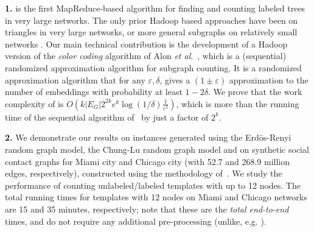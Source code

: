 
\smallskip
\textbf{1.} \sahad{} is the first MapReduce-based algorithm for finding and
counting labeled trees in very large networks.
The only prior Hadoop based approaches have been on triangles
\cite{tsourakakis2009doulion, pagh2011colorful, suri2011counting} in very large
networks, or more general subgraphs on relatively small networks
\cite{liu2009mapreduce}. Our main technical contribution is the development of a
Hadoop version of the \emph{color coding}
algorithm of Alon \emph{et al}.~\cite{alon2008biomolecular, alon1995color}, which
is a (sequential) randomized approximation algorithm for subgraph counting.
It is a randomized approximation algorithm that for any $\varepsilon, \delta$,
gives a $(1\pm\varepsilon)$ approximation to the number of embeddings with
probability at least $1-2\delta$.
We prove that the work complexity of \sahad{} is
$O(k|E_G|2^{2k}e^k\log{(1/\delta)}\frac{1}{\varepsilon^2})$, which is more than
the running time of the sequential algorithm of~\cite{alon2008biomolecular}
by just a factor of $2^k$.

\iffalse
One of the main challenges for parallel algorithms is that only a part of the
graph can be stored in memory if it is very large. Most real networks are characterized
by small diameter and high expansion, so that even storing the $d$-neighborhood
of a node  $v$ (consisting of nodes within distance $d$ of $v$) is infeasible.
This makes searching for subgraphs with diameter more than $d$ very challenging,
since an embedding might be split across partitions. Our approach based on
color-coding solves this ingeniously by considering ``colorful'' embeddings,
as discussed in Section~\ref{sec:intro-color-coding}.
\fi

\smallskip
\textbf{2.} We demonstrate our results on instances generated using the Erd\"{o}s-Renyi
random graph model, the Chung-Lu random graph model
and on synthetic social contact graphs for Miami city and Chicago city
(with 52.7 and 268.9 million edges, respectively), constructed using
the methodology of~\cite{barrett2009generation}. We study the performance of
counting unlabeled/labeled templates with up to 12 nodes. The total running
times for templates with 12 nodes on Miami and Chicago networks are 15 and 35
minutes, respectively; note that these are the \emph{total end-to-end} times,
and do not require any additional pre-processing (unlike, e.g.
\cite{brocheler2010cosi}).



